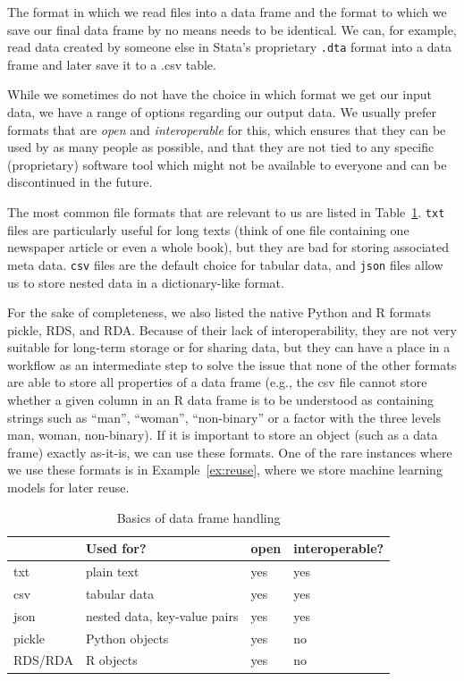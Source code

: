 The format in which we read files into a data frame and the format to which we save our final data frame by no means needs to be identical. We can, for example, read data created by someone else in Stata's proprietary
\verb|.dta| format into a data frame and later save it to a .csv table.

While we sometimes do not have the choice in which format we get our input data, we have a range of options regarding our output data. We usually prefer formats that are \emph{open} and \emph{interoperable} for this, which ensures that they can be used by as many people as possible, and that they are not tied to any specific (proprietary) software tool which might not be available to everyone and can be discontinued in the future.

The most common file formats that are relevant to us are listed in Table~\ref{tab:fileformats}. \verb|txt| files are particularly useful for long texts (think of one file containing one newspaper article or even a whole book), but they are bad for storing associated meta data. \verb|csv| files are the default choice for tabular data, and \verb|json| files allow us to store nested data in a dictionary-like format.

For the sake of completeness, we also listed the native Python and R formats pickle, RDS, and RDA. Because of their lack of interoperability, they are not very suitable for long-term storage or for sharing data, but they can have a place in a workflow as an intermediate step to solve the issue that none of the other formats are able to store all properties of a data frame (e.g., the csv file cannot store whether a given column in an R data frame is to be understood as containing strings such as ``man'', ``woman'', ``non-binary'' or a factor with the three levels man, woman, non-binary). If it is important to store an object (such as a data frame) exactly as-it-is, we can use these formats. One of the rare instances where we use these formats is in Example~\ref{ex:reuse}, where we store machine learning models for later reuse.

\begin{table}[]
\caption{\label{tab:fileformats} Basics of data frame handling}{%
\begin{tabular}{@{}llll@{}}
\toprule
        & Used for?             & open   & interoperable?\\
\midrule
txt     & plain text            &yes & yes            \\
csv     & tabular data          & yes & yes            \\
json    & nested data, key-value pairs   & yes & yes             \\
pickle  & Python objects        & yes & no     \\
RDS/RDA & R objects             & yes & no \\
\bottomrule
\end{tabular}}{}
\end{table}


